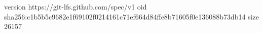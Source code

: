 version https://git-lfs.github.com/spec/v1
oid sha256:c1b5b5c9682e1f69102f0214161c71ef664d84ffe8b71605f0e136088b73db14
size 26157
